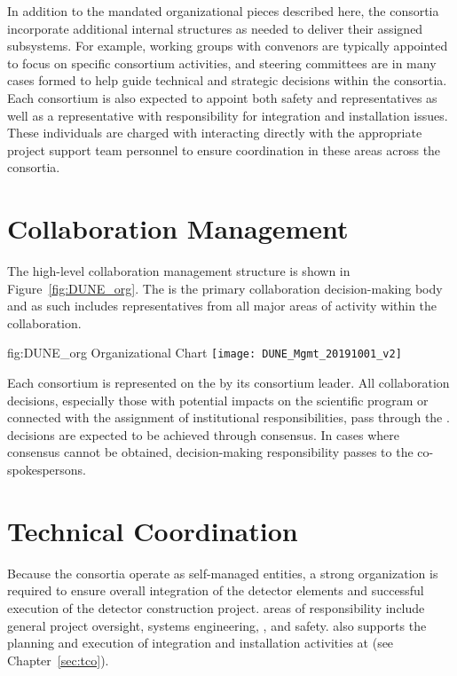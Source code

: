 In addition to the mandated organizational pieces described here, 
the consortia incorporate additional internal structures as needed 
to deliver their assigned subsystems.  For example, working groups 
with convenors are typically appointed to focus on specific consortium 
activities, and steering committees are in many cases formed to help 
guide technical and strategic decisions within the consortia.  Each 
consortium is also expected to appoint both safety and  
representatives as well as a representative with responsibility for 
integration and installation issues.  These individuals are charged 
with interacting directly with the appropriate project support team 
personnel to ensure coordination in these areas across the consortia.        

\section{ Collaboration Management}
\label{sec:dune_mgmt}

The high-level  collaboration management structure is 
shown in Figure~\ref{fig:DUNE_org}.  The   is 
the primary collaboration decision-making body and as such includes 
representatives from all major areas of activity within the 
collaboration.
\begin{dunefigure}{fig:DUNE_org}
  { Organizational Chart}
  \texttt{[image: DUNE\_Mgmt\_20191001\_v2]}
\end{dunefigure}

Each consortium is represented on the   by its 
consortium leader.  All collaboration decisions, especially those with 
potential impacts on the  scientific program or connected 
with the assignment of institutional responsibilities, pass through the 
.   decisions are expected to be achieved through 
consensus.  In cases where consensus cannot be obtained, decision-making 
responsibility passes to the co-spokespersons.

\section{Technical Coordination}
\label{sec:tc}

Because the consortia operate as self-managed entities, a strong
 organization is required to ensure overall integration 
of the detector elements and successful execution of the detector
construction project.   areas of responsibility include 
general project oversight, systems engineering, , and 
safety.   also supports the planning and execution 
of integration and installation activities at  (see 
Chapter~\ref{sec:tco}).  

